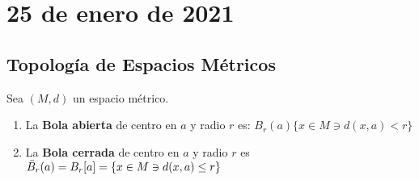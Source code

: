 \section{25 de enero de 2021}

\subsection{Topología de Espacios Métricos}
\begin{definition}
Sea $(M,d)$ un espacio métrico. 
\begin{enumerate}
    \item La \textbf{Bola abierta} de centro en $a$ y radio $r$ es: $B_r(a)\{x\in M\ni d(x,a)<r\}$
    \item La \textbf{Bola cerrada} de centro en $a$ y radio $r$ es $\Bar{B}_r(a)=B_r[a]=\{x\in M\ni d(x,a)\leq r\}$
\end{enumerate}
\end{definition}

